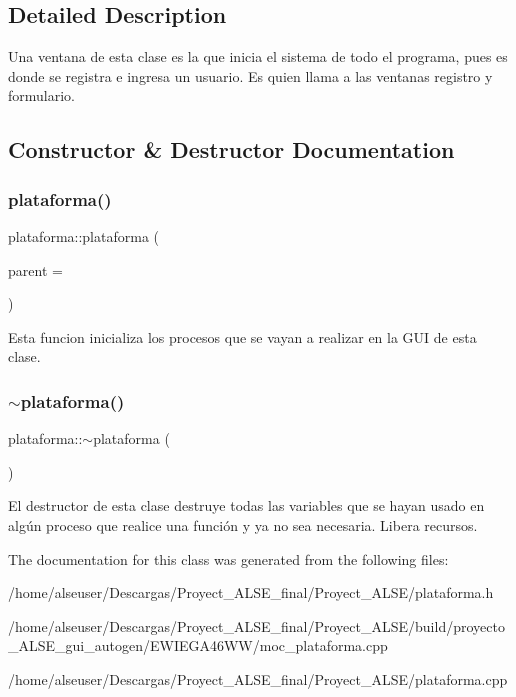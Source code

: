 \subsection{Detailed Description}
Una ventana de esta clase es la que inicia el sistema de todo el programa, pues es donde se registra e ingresa un usuario. Es quien llama a las ventanas registro y formulario. 

\subsection{Constructor \& Destructor Documentation}
\mbox{\label{classplataforma_a200eafd497e5192ed3c535ad9653d824}} 
\subsubsection{\texorpdfstring{plataforma()}{plataforma()}}
{\footnotesize\ttfamily plataforma\+::plataforma (\begin{DoxyParamCaption}\item[{Q\+Widget $\ast$}]{parent = {} }\end{DoxyParamCaption})\hspace{0.3cm}{\ttfamily [explicit]}}

Esta funcion inicializa los procesos que se vayan a realizar en la G\+UI de esta clase. \mbox{\label{classplataforma_a8c90e738adb0469626698000d7760c85}} 
\subsubsection{\texorpdfstring{$\sim$plataforma()}{~plataforma()}}
{\footnotesize\ttfamily plataforma\+::$\sim$plataforma (\begin{DoxyParamCaption}{ }\end{DoxyParamCaption})}

El destructor de esta clase destruye todas las variables que se hayan usado en algún proceso que realice una función y ya no sea necesaria. Libera recursos. 

The documentation for this class was generated from the following files\+:\begin{DoxyCompactItemize}
\item 
/home/alseuser/\+Descargas/\+Proyect\+\_\+\+A\+L\+S\+E\+\_\+final/\+Proyect\+\_\+\+A\+L\+S\+E/plataforma.\+h\item 
/home/alseuser/\+Descargas/\+Proyect\+\_\+\+A\+L\+S\+E\+\_\+final/\+Proyect\+\_\+\+A\+L\+S\+E/build/proyecto\+\_\+\+A\+L\+S\+E\+\_\+gui\+\_\+autogen/\+E\+W\+I\+E\+G\+A46\+W\+W/moc\+\_\+plataforma.\+cpp\item 
/home/alseuser/\+Descargas/\+Proyect\+\_\+\+A\+L\+S\+E\+\_\+final/\+Proyect\+\_\+\+A\+L\+S\+E/plataforma.\+cpp\end{DoxyCompactItemize}
